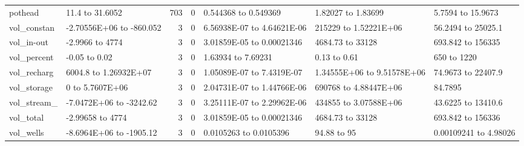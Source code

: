 \documentclass{article}
\begin{document}
\begin{center}
\begin{landscape}
\begin{longtable}{llrrlll}
pothead &  11.4 to 31.6052 & 703 & 0 & 0.544368 to 0.549369 & 1.82027 to 1.83699 & 5.7594 to 15.9673 \\
vol_constan & -2.70556E+06 to -860.052 & 3 & 0 & 6.56938E-07 to 4.64621E-06 & 215229 to 1.52221E+06 & 56.2494 to 25025.1 \\
vol_in-out & -2.9966 to  4774 & 3 & 0 & 3.01859E-05 to 0.00021346 & 4684.73 to 33128 & 693.842 to 156335 \\
vol_percent & -0.05 to  0.02 & 3 & 0 & 1.63934 to 7.69231 &  0.13 to  0.61 &   650 to  1220 \\
vol_recharg & 6004.8 to 1.26932E+07 & 3 & 0 & 1.05089E-07 to 7.4319E-07 & 1.34555E+06 to 9.51578E+06 & 74.9673 to 22407.9 \\
vol_storage &     0 to 5.7607E+06 & 3 & 0 & 2.04731E-07 to 1.44766E-06 & 690768 to 4.88447E+06 & 84.7895 \\
vol_stream_ & -7.0472E+06 to -3242.62 & 3 & 0 & 3.25111E-07 to 2.29962E-06 & 434855 to 3.07588E+06 & 43.6225 to 13410.6 \\
vol_total & -2.99658 to  4774 & 3 & 0 & 3.01859E-05 to 0.00021346 & 4684.73 to 33128 & 693.842 to 156336 \\
vol_wells & -8.6964E+06 to -1905.12 & 3 & 0 & 0.0105263 to 0.0105396 & 94.88 to    95 & 0.00109241 to 4.98026 \\
\end{longtable}
\end{landscape}
\end{center}
\end{document}
